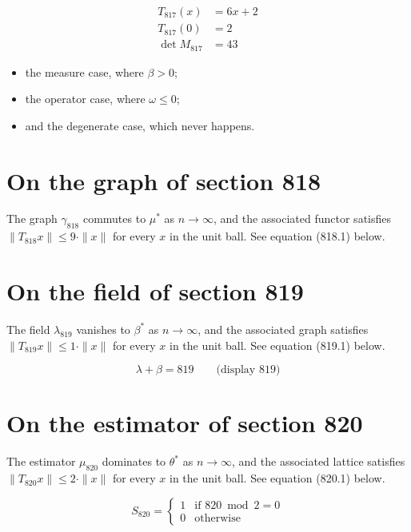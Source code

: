 \documentclass{article}
\begin{document}
\begin{align}
T_{817}(x) &= 6 x + 2 \\
T_{817}(0) &= 2 \\
\det M_{817} &= 43
\end{align}

\begin{itemize}
  \item the measure case, where $\beta > 0$;
  \item the operator case, where $\omega \leq 0$;
  \item and the degenerate case, which never happens.
\end{itemize}

\section{On the graph of section 818}
The graph $\gamma_{818}$ commutes to $\mu^{*}$ as $n \to \infty$,
and the associated functor satisfies $\|T_{818} x\| \leq 9 \cdot \|x\|$
for every $x$ in the unit ball. See equation (818.1) below.

\section{On the field of section 819}
The field $\lambda_{819}$ vanishes to $\beta^{*}$ as $n \to \infty$,
and the associated graph satisfies $\|T_{819} x\| \leq 1 \cdot \|x\|$
for every $x$ in the unit ball. See equation (819.1) below.

$$
\lambda + \beta = 819 \qquad \text{(display 819)}
$$

\section{On the estimator of section 820}
The estimator $\mu_{820}$ dominates to $\theta^{*}$ as $n \to \infty$,
and the associated lattice satisfies $\|T_{820} x\| \leq 2 \cdot \|x\|$
for every $x$ in the unit ball. See equation (820.1) below.

\begin{equation}
S_{820} = \begin{cases} 1 & \text{if } 820 \bmod 2 = 0 \\ 0 & \text{otherwise} \end{cases}
\end{equation}
\end{document}
